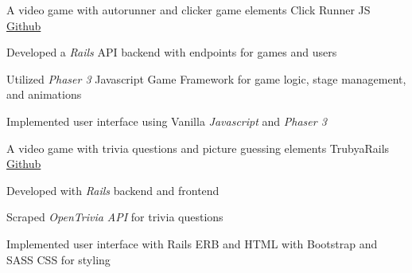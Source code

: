 \begin{cventries}
\cventry
    {A video game with autorunner and clicker game elements} %
    {Click Runner JS} %
    {\href{https://github.com/jhcheung/click-runner-js}{Github}} %
    {} %
    {
    \begin{cvitems} %
        \item {Developed a \textit{Rails} API backend with endpoints for games and users} 
		\item {Utilized \textit{Phaser 3} Javascript Game Framework for game logic, stage management, and animations}
		\item {Implemented user interface using Vanilla \textit{Javascript} and \textit{Phaser 3}}      
    \end{cvitems}
}

\cventry
    {A video game with trivia questions and picture guessing elements} %
    {TrubyaRails} %
    {\href{https://github.com/jhcheung/trubya-rails}{Github}} %
    {} %
    {
    \begin{cvitems} %
		\item {Developed with \textit{Rails} backend and frontend}
		\item {Scraped \textit{OpenTrivia API} for trivia questions} 
		\item {Implemented user interface with Rails ERB and HTML with Bootstrap and SASS CSS for styling}
    \end{cvitems}
}



\end{cventries}
